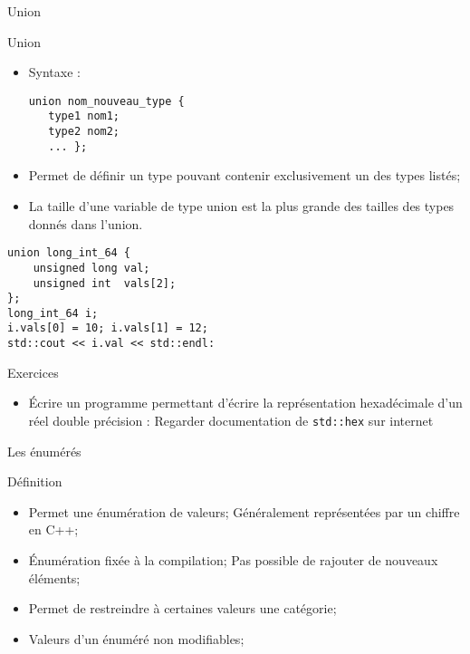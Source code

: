 \documentclass[handout,10pt]{beamer}
\newcommand{\includepartcode}[4][cpp]{

}
\begin{document}
\begin{frame}[fragile]{Union}
\tiny
\begin{block}{Union}
\begin{itemize}
 \item Syntaxe :
\begin{lstlisting}
union nom_nouveau_type {
   type1 nom1;
   type2 nom2;
   ... };
\end{lstlisting}
 \item Permet de définir un type pouvant contenir exclusivement un des types listés;
 \item La taille d'une variable de type union est la plus grande des tailles des types donnés dans l'union.
\end{itemize}
\begin{lstlisting}
union long_int_64 {
    unsigned long val;
    unsigned int  vals[2];
};
long_int_64 i; 
i.vals[0] = 10; i.vals[1] = 12;
std::cout << i.val << std::endl:
\end{lstlisting}
\end{block}

\begin{exampleblock}{Exercices}
 \begin{itemize}
  \item \'Ecrire un programme permettant d'écrire la représentation hexadécimale d'un réel double précision :
  Regarder documentation de \lstinline$std::hex$ sur internet 
 \end{itemize}

\end{exampleblock}

\end{frame}

\begin{frame}[fragile]{Les énumérés}
\tiny
\begin{block}{Définition}
\begin{itemize}
\item Permet une énumération de valeurs; Généralement représentées par un chiffre en C++;
\item \'Enumération fixée à la compilation; Pas possible de rajouter de nouveaux éléments;
\item Permet de restreindre à certaines valeurs une catégorie;
\item Valeurs d'un énuméré non modifiables;
\end{itemize}
\end{block}
\includepartcode{enumeres.cpp}{5}{21}
\end{frame}
\end{document}
